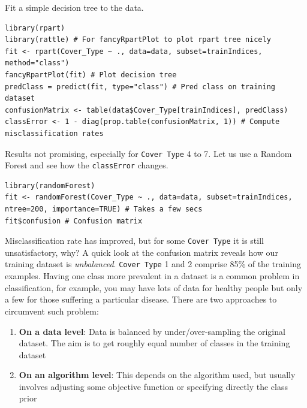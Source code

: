 \documentclass[a4paper,11pt]{article}
\begin{document}
Fit a simple decision tree to the data.
\\
\begin{lstlisting}[style=RCode]
library(rpart)
library(rattle) # For fancyRpartPlot to plot rpart tree nicely
fit <- rpart(Cover_Type ~ ., data=data, subset=trainIndices, method="class")
fancyRpartPlot(fit) # Plot decision tree
predClass = predict(fit, type="class") # Pred class on training dataset
confusionMatrix <- table(data$Cover_Type[trainIndices], predClass)
classError <- 1 - diag(prop.table(confusionMatrix, 1)) # Compute misclassification rates
\end{lstlisting}

Results not promising, especially for \texttt{Cover Type} 4 to 7. Let
us use a Random Forest and see how the \texttt{classError} changes. 
\\
\begin{lstlisting}[style=RCode]
library(randomForest)
fit <- randomForest(Cover_Type ~ ., data=data, subset=trainIndices, ntree=200, importance=TRUE) # Takes a few secs
fit$confusion # Confusion matrix
\end{lstlisting}

Misclassification rate has improved, but for some \texttt{Cover Type} it is still unsatisfactory,
why? A quick look at the confusion matrix reveals how our training dataset is \textit{unbalanced}. 
\texttt{Cover Type} 1 and 2 comprise 85\% of the training examples. Having one class more prevalent
in a dataset is a common problem in classification, for example, you may have lots of data
for healthy people but only a few for those suffering a particular disease. There are two
approaches to circumvent such problem:

\begin{enumerate}
	\item \textbf{On a data level}: Data is balanced by under/over-sampling the original dataset. The aim is to get roughly
	equal number of classes in the training dataset
	\item \textbf{On an algorithm level}: This depends on the algorithm used, but usually involves adjusting some objective function 
	or specifying directly the class prior
\end{enumerate}
\end{document}

